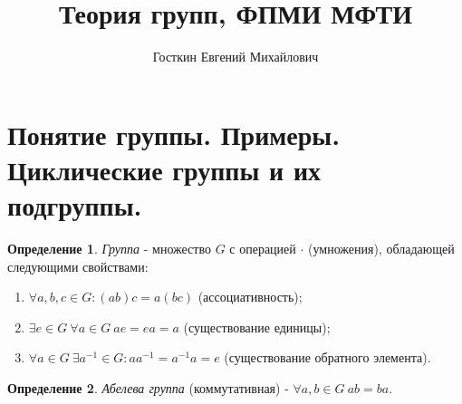\documentclass[11pt,a4paper]{report}
\title{\textbf{Теория групп, ФПМИ МФТИ}}
\author{Госткин Евгений Михайлович}
\date{}
\theoremstyle{definition}
\theoremstyle{definition}
\theoremstyle{definition}
\newtheorem{definition}{Определение}[section]
\begin{document}
  \setlength{\parindent}{1cm}
  \maketitle
  \tableofcontents
  \newpage
  \section{Понятие группы. Примеры. Циклические группы и их подгруппы.}
  \begin{definition}\label{group_def}
  {\it Группа} - множество $G$ с операцией $\cdot$ (умножения), обладающей следующими свойствами:
 		\begin{enumerate}
	 		\item{$\forall a, b, c \in G: (ab)c = a(bc)$ (ассоциативность);}
 			\item{$\exists e \in G~ \forall a \in G~ ae=ea=a$ (существование единицы);}
 			\item{$\forall a \in G ~\exists a^{-1}\in G:aa^{-1}=a^{-1}a=e$ (существование обратного элемента).}
 		\end{enumerate}
  \end{definition}
  \begin{definition}\label{abelian_group_def}
  	{\it Абелева группа} (коммутативная) - $\forall a, b \in G~ab=ba$.
  \end{definition}
  
\end{document}
